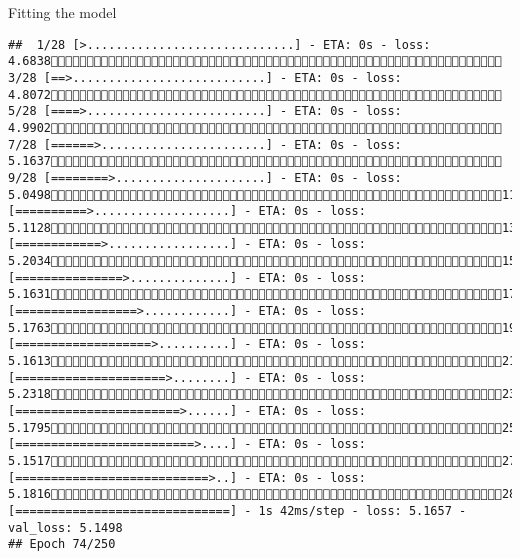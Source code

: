 \documentclass[
  ignorenonframetext,
]{beamer}
\begin{document}
\begin{frame}[fragile]{Fitting the model}
\begin{verbatim}
##  1/28 [>.............................] - ETA: 0s - loss: 4.6838 3/28 [==>...........................] - ETA: 0s - loss: 4.8072 5/28 [====>.........................] - ETA: 0s - loss: 4.9902 7/28 [======>.......................] - ETA: 0s - loss: 5.1637 9/28 [========>.....................] - ETA: 0s - loss: 5.049811/28 [==========>...................] - ETA: 0s - loss: 5.112813/28 [============>.................] - ETA: 0s - loss: 5.203415/28 [===============>..............] - ETA: 0s - loss: 5.163117/28 [=================>............] - ETA: 0s - loss: 5.176319/28 [===================>..........] - ETA: 0s - loss: 5.161321/28 [=====================>........] - ETA: 0s - loss: 5.231823/28 [=======================>......] - ETA: 0s - loss: 5.179525/28 [=========================>....] - ETA: 0s - loss: 5.151727/28 [===========================>..] - ETA: 0s - loss: 5.181628/28 [==============================] - 1s 42ms/step - loss: 5.1657 - val_loss: 5.1498
## Epoch 74/250

\end{verbatim}
\end{frame}
\end{document}
